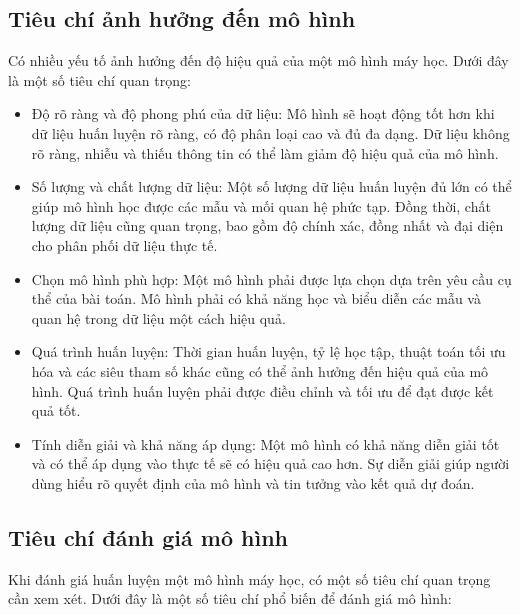 \subsection{Tiêu chí ảnh hưởng đến mô hình}	

Có nhiều yếu tố ảnh hưởng đến độ hiệu quả của một mô hình máy học. Dưới đây là một số tiêu chí quan trọng:

\begin{itemize}
	\item Độ rõ ràng và độ phong phú của dữ liệu: Mô hình sẽ hoạt động tốt hơn khi dữ liệu huấn luyện rõ ràng, có độ phân loại cao và đủ đa dạng. Dữ liệu không rõ ràng, nhiễu và thiếu thông tin có thể làm giảm độ hiệu quả của mô hình.
	
	\item Số lượng và chất lượng dữ liệu: Một số lượng dữ liệu huấn luyện đủ lớn có thể giúp mô hình học được các mẫu và mối quan hệ phức tạp. Đồng thời, chất lượng dữ liệu cũng quan trọng, bao gồm độ chính xác, đồng nhất và đại diện cho phân phối dữ liệu thực tế.
	
	\item Chọn mô hình phù hợp: Một mô hình phải được lựa chọn dựa trên yêu cầu cụ thể của bài toán. Mô hình phải có khả năng học và biểu diễn các mẫu và quan hệ trong dữ liệu một cách hiệu quả.
	
	\item Quá trình huấn luyện: Thời gian huấn luyện, tỷ lệ học tập, thuật toán tối ưu hóa và các siêu tham số khác cũng có thể ảnh hưởng đến hiệu quả của mô hình. Quá trình huấn luyện phải được điều chỉnh và tối ưu để đạt được kết quả tốt.
	
	\item Tính diễn giải và khả năng áp dụng: Một mô hình có khả năng diễn giải tốt và có thể áp dụng vào thực tế sẽ có hiệu quả cao hơn. Sự diễn giải giúp người dùng hiểu rõ quyết định của mô hình và tin tưởng vào kết quả dự đoán.	
\end{itemize}

\subsection{Tiêu chí đánh giá mô hình}

Khi đánh giá huấn luyện một mô hình máy học, có một số tiêu chí quan trọng cần xem xét. Dưới đây là một số tiêu chí phổ biến để đánh giá mô hình:

